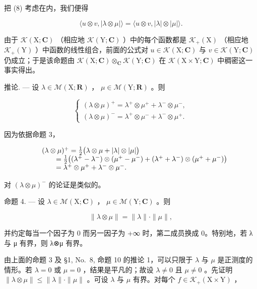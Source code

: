 把 (8) 考虑在内，我们便得

\[
\langle u \otimes v, | \lambda \otimes \mu | \rangle = \langle u \otimes v, | \lambda | \otimes | \mu | \rangle .
\]

由于 \(\mathcal{K}(\mathrm{X};\mathbf{C})\) （相应地 \(\mathcal{K}(\mathrm{Y};\mathbf{C})\) ）中的每个函数都是 \(\mathcal{K}_{+}(\mathrm{X})\) （相应地 \(\mathcal{K}_{+}(\mathrm{Y})\) ）中函数的线性组合，前面的公式对 \(u\in\mathcal{K}(\mathrm{X};\mathbf{C})\) 与 \(v\in\mathcal{K}(\mathrm{Y};\mathbf{C})\) 仍成立；于是该命题由 \(\mathcal{K}(\mathrm{X};\mathbf{C})\otimes_{\mathbf{C}}\mathcal{K}(\mathrm{Y};\mathbf{C})\) 在 \(\mathcal{K}(\mathrm{X}\times\mathrm{Y};\mathbf{C})\) 中稠密这一事实得出。

推论. --- 设 \(\lambda \in \mathcal{M}(\mathrm{X};\mathbf{R})\) ， \(\mu \in \mathcal{M}(\mathrm{Y};\mathbf{R})\) 。则

\[
\left\{ \begin{array}{l} (\lambda \otimes \mu) ^ {+} = \lambda^ {+} \otimes \mu^ {+} + \lambda^ {-} \otimes \mu^ {-}, \\ (\lambda \otimes \mu) ^ {-} = \lambda^ {+} \otimes \mu^ {-} + \lambda^ {-} \otimes \mu^ {+}. \end{array} \right.\tag{9}
\]

因为依据命题 3，

\[
\begin{array}{r l} & {(\lambda \otimes \mu) ^ {+} = \frac {1}{2} \big (\lambda \otimes \mu + | \lambda | \otimes | \mu | \big)} \\ & {\qquad = \frac {1}{2} \big ((\lambda^ {+} - \lambda^ {-}) \otimes (\mu^ {+} - \mu^ {-}) + (\lambda^ {+} + \lambda^ {-}) \otimes (\mu^ {+} + \mu^ {-}) \big)} \\ & {\qquad = \lambda^ {+} \otimes \mu^ {+} + \lambda^ {-} \otimes \mu^ {-}.} \end{array}
\]

对 \((\lambda \otimes \mu)^{-}\) 的论证是类似的。

命题 4. --- 设 \(\lambda \in \mathcal{M}(\mathrm{X};\mathbf{C})\) ， \(\mu \in \mathcal{M}(\mathrm{Y};\mathbf{C})\) 。则

\[
\| \lambda \otimes \mu \| = \| \lambda \| \cdot \| \mu \|,\tag{10}
\]

并约定每当一个因子为 0 而另一因子为 +∞ 时，第二成员换成 0。特别地，若 λ 与 μ 有界，则 λ⊗μ 有界。

由上面的命题 3 及 §1, No.~8, 命题 10 的推论 1，可以只限于 \(\lambda\) 与 \(\mu\) 是正测度的情形。若 \(\lambda = 0\) 或 \(\mu = 0\) ，结果是平凡的；故设 \(\lambda \neq 0\) 且 \(\mu \neq 0\) 。先证明 \(\| \lambda \otimes \mu \| \leqslant \| \lambda \| \cdot \| \mu \|\) 。可设 \(\lambda\) 与 \(\mu\) 有界。对每个 \(f \in \mathcal{K}_+(\mathrm{X} \times \mathrm{Y})\) ，

